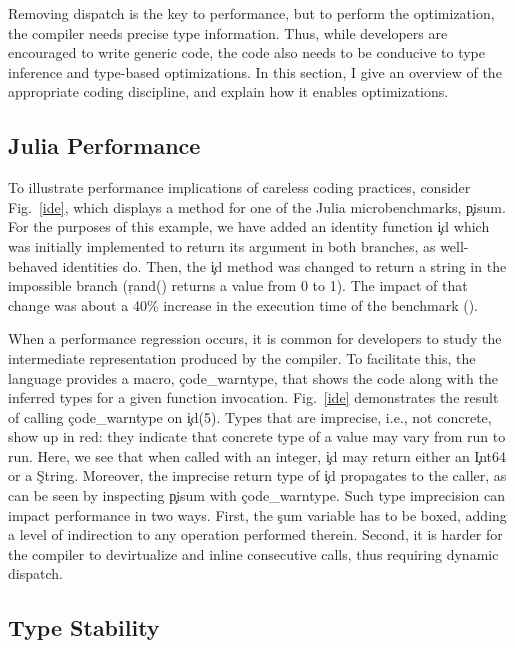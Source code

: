 Removing dispatch is the key to performance, but to perform the optimization,
the compiler needs precise type information. Thus, while developers
are encouraged to write generic code, the code also needs to be conducive
to type inference and type-based optimizations.
In this section, I give an overview of the appropriate coding discipline, and
explain how it enables optimizations.

\subsection{Julia Performance}\label{ssec:perf}

To illustrate performance implications of careless
coding practices, consider Fig.~\ref{ide}, which displays a method for one of
the Julia microbenchmarks, \c{pisum}. For the purposes of this example, we
have added an identity function \c{id} which was initially implemented to
return its argument in both branches, as well-behaved identities do.
Then, the \c{id} method was changed to return a string in the impossible
branch (\c{rand()} returns a value from 0 to 1). The impact of that change
was about a 40\% increase in the execution time of the benchmark (\juliaversion).



When a performance regression occurs, it is common for developers to study the
intermediate representation produced by the compiler. To facilitate this, the
language provides a macro, \c{code_warntype}, that shows the code along with the
inferred types for a given function invocation. Fig.~\ref{ide} demonstrates the result of
calling \c{code_warntype} on \c{id(5)}. Types that are imprecise, i.e., not
concrete, show up in red: they indicate that concrete type of a value may vary
from run to run. Here, we see that when called with an integer,
\c{id} may return either an
\c{Int64} or a \c{String}.
Moreover, the imprecise return type of \c{id} propagates to the caller,
as can be seen by inspecting \c{pisum} with \c{code_warntype}.
%
Such type imprecision can impact performance in two ways. First,
the \c{sum} variable has to be boxed, adding a level of indirection to
any operation performed therein. Second, it is harder for
the compiler to devirtualize and inline consecutive calls, thus requiring
dynamic dispatch.

\subsection{Type Stability}\label{ssect:ts-informal}

